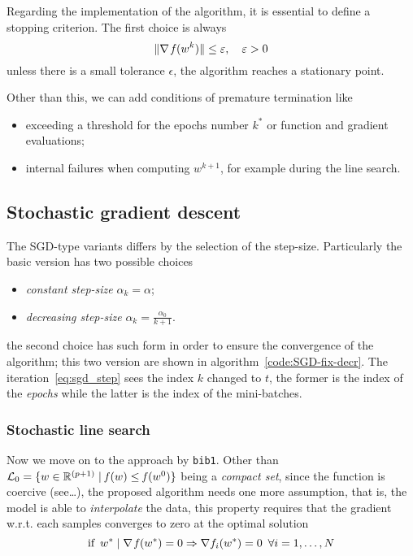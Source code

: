 Regarding the implementation of the algorithm, it is essential to define a stopping criterion. The first choice is always
\begin{equation}\label{eq:stopping1}
\lVert\nabla\operatorname*{\mathit{f}}(w^k)\rVert\leq\varepsilon,\quad\varepsilon>0
\end{equation}
unless there is a small tolerance $\epsilon$, the algorithm reaches a stationary point.

Other than this, we can add conditions of premature termination like
\begin{itemize}
\item exceeding a threshold for the epochs number $k^\ast$ or function and gradient evaluations;
\item internal failures when computing $w^{k+1}$, for example during the line search.
\end{itemize}

\subsection{Stochastic gradient descent}

The SGD-type variants differs by the selection of the step-size. Particularly the basic version has two possible choices
\begin{itemize}
\item \emph{constant step-size} $\alpha_k=\alpha$;
\item \emph{decreasing step-size} $\alpha_k=\frac{\alpha_0}{k+1}$.
\end{itemize}
the second choice has such form in order to ensure the convergence of the algorithm; this two version are shown in algorithm~\vref{code:SGD-fix-decr}. The iteration~\eqref{eq:sgd_step} sees the index $k$ changed to $t$, the former is the index of the \emph{epochs} while the latter is the index of the mini-batches.

\subsubsection{Stochastic line search}

Now we move on to the approach by \texttt{bib1}. Other than $\mathcal{L}_0=\{w\in\mathbb{R}^{(p+1)}\mid\operatorname*{\mathit{f}}(w)\leq\operatorname*{\mathit{f}}(w^0)\}$ being a \emph{compact set}, since the function is coercive (see\dots), the proposed algorithm needs one more assumption, that is, the model is able to \emph{interpolate} the data, this property requires that the gradient w.r.t. each samples converges to zero at the optimal solution
\[
\text{if}\,\,\,w^\ast\mid\nabla\operatorname*{\mathit{f}}(w^\ast)=0\Rightarrow\nabla f_i(w^\ast)=0\,\,\,\forall i=1,\dots,N
\]

